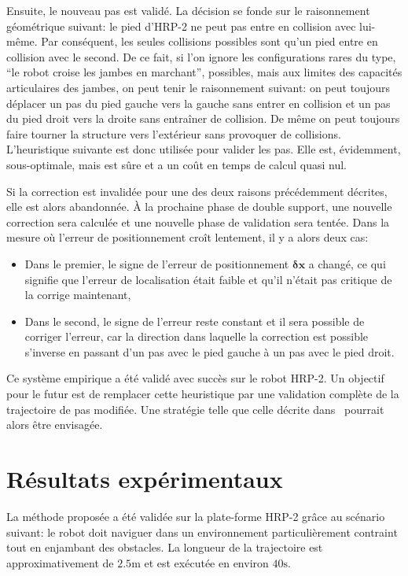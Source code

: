 Ensuite, le nouveau pas est validé. La décision se fonde sur le
raisonnement géométrique suivant: le pied d'HRP-2 ne peut pas entre en
collision avec lui-même. Par conséquent, les seules collisions
possibles sont qu'un pied entre en collision avec le second. De ce
fait, si l'on ignore les configurations rares du type, ``le robot
croise les jambes en marchant'', possibles, mais aux limites des
capacités articulaires des jambes, on peut tenir le raisonnement
suivant: on peut toujours déplacer un pas du pied gauche vers la
gauche sans entrer en collision et un pas du pied droit vers la droite
sans entraîner de collision. De même on peut toujours faire tourner la
structure vers l'extérieur sans provoquer de collisions. L'heuristique
suivante est donc utilisée pour valider les pas. Elle est, évidemment,
sous-optimale, mais est sûre et a un coût en temps de calcul quasi
nul.


Si la correction est invalidée pour une des deux raisons précédemment
décrites, elle est alors abandonnée. À la prochaine phase de double
support, une nouvelle correction sera calculée et une nouvelle phase
de validation sera tentée. Dans la mesure où l'erreur de
positionnement croît lentement, il y a alors deux cas:
\begin{itemize}
\item Dans le premier, le signe de l'erreur de positionnement
  $\mathbf{\delta {x}}$ a changé, ce qui signifie que l'erreur de
  localisation était faible et qu'il n'était pas critique de la
  corrige maintenant,
\item Dans le second, le signe de l'erreur reste constant et il sera
  possible de corriger l'erreur, car la direction dans laquelle la
  correction est possible s'inverse en passant d'un pas avec le pied
  gauche à un pas avec le pied droit.
\end{itemize}

Ce système empirique a été validé avec succès sur le robot HRP-2. Un
objectif pour le futur est de remplacer cette heuristique par une
validation complète de la trajectoire de pas modifiée. Une stratégie
telle que celle décrite dans \cite{10perrin.icra} pourrait alors être
envisagée.

\section{Résultats expérimentaux}\label{exp}


La méthode proposée a été validée sur la plate-forme HRP-2 grâce au
scénario suivant: le robot doit naviguer dans un environnement
particulièrement contraint tout en enjambant des obstacles. La
longueur de la trajectoire est approximativement de $2.5\mathrm{m}$ et
est exécutée en environ $40\mathrm{s}$.


